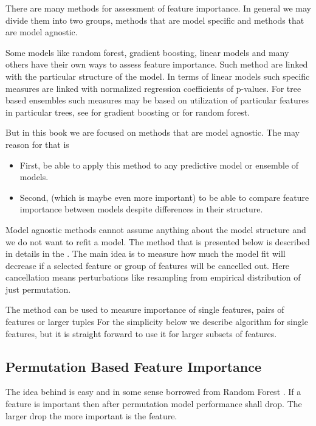 \documentclass[12pt,]{krantz}
\providecommand{\tightlist}{%
  \setlength{\itemsep}{0pt}\setlength{\parskip}{0pt}}
\theoremstyle{definition}
\theoremstyle{definition}
\theoremstyle{definition}
\theoremstyle{remark}
\begin{document}
There are many methods for assessment of feature importance. In general
we may divide them into two groups, methods that are model specific and
methods that are model agnostic.

Some models like random forest, gradient boosting, linear models and
many others have their own ways to assess feature importance. Such
method are linked with the particular structure of the model. In terms
of linear models such specific measures are linked with normalized
regression coefficients of p-values. For tree based ensembles such
measures may be based on utilization of particular features in
particular trees, see \citep{xgboostExplainer} for gradient boosting or
\citep{randomForestExplainer} for random forest.

But in this book we are focused on methods that are model agnostic. The
may reason for that is

\begin{itemize}
\tightlist
\item
  First, be able to apply this method to any predictive model or
  ensemble of models.
\item
  Second, (which is maybe even more important) to be able to compare
  feature importance between models despite differences in their
  structure.
\end{itemize}

Model agnostic methods cannot assume anything about the model structure
and we do not want to refit a model. The method that is presented below
is described in details in the \citep{variableImportancePermutations}.
The main idea is to measure how much the model fit will decrease if a
selected feature or group of features will be cancelled out. Here
cancellation means perturbations like resampling from empirical
distribution of just permutation.

The method can be used to measure importance of single features, pairs
of features or larger tuples For the simplicity below we describe
algorithm for single features, but it is straight forward to use it for
larger subsets of features.

\hypertarget{permutation-based-feature-importance}{%
\subsection{Permutation Based Feature
Importance}\label{permutation-based-feature-importance}}

The idea behind is easy and in some sense borrowed from Random Forest
\citep{R-randomForest}. If a feature is important then after permutation
model performance shall drop. The larger drop the more important is the
feature.
\end{document}
